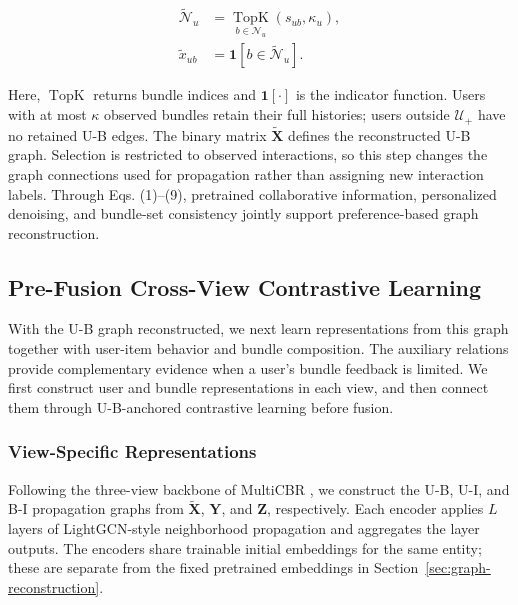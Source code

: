 \documentclass[letterpaper]{article}
\begin{document}
\begin{equation}
\begin{aligned}
\widetilde{\mathcal N}_u
&=\underset{b\in\mathcal N_u}{\operatorname{TopK}}
\left(s_{ub},\kappa_u\right),\\
\widetilde x_{ub}
&=\mathbf 1\!\left[b\in\widetilde{\mathcal N}_u\right].
\end{aligned}
\tag{9}
\end{equation}

Here, $\operatorname{TopK}$ returns bundle indices and $\mathbf 1[\cdot]$ is the indicator function. Users with at most $\kappa$ observed bundles retain their full histories; users outside $\mathcal U_+$ have no retained U-B edges. The binary matrix $\widetilde{\mathbf X}$ defines the reconstructed U-B graph. Selection is restricted to observed interactions, so this step changes the graph connections used for propagation rather than assigning new interaction labels. Through Eqs. (1)--(9), pretrained collaborative information, personalized denoising, and bundle-set consistency jointly support preference-based graph reconstruction.

\subsection{Pre-Fusion Cross-View Contrastive Learning}

With the U-B graph reconstructed, we next learn representations from this graph together with user-item behavior and bundle composition. The auxiliary relations provide complementary evidence when a user's bundle feedback is limited. We first construct user and bundle representations in each view, and then connect them through U-B-anchored contrastive learning before fusion.

\subsubsection{View-Specific Representations}

Following the three-view backbone of MultiCBR \cite{ma2024multicbr}, we construct the U-B, U-I, and B-I propagation graphs from $\widetilde{\mathbf X}$, $\mathbf Y$, and $\mathbf Z$, respectively. Each encoder applies $L$ layers of LightGCN-style neighborhood propagation \cite{he2020lightgcn} and aggregates the layer outputs. The encoders share trainable initial embeddings for the same entity; these are separate from the fixed pretrained embeddings in Section~\ref{sec:graph-reconstruction}.
\end{document}
